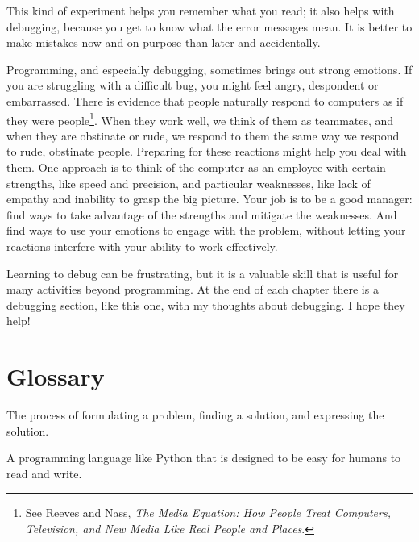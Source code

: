 
\begin{remark}
This kind of experiment helps you remember what you read; it also helps
with debugging, because you get to know what the error messages mean.
It is better to make mistakes now and on purpose than later
and accidentally.
\end{remark}

Programming, and especially debugging, sometimes brings out strong
emotions.  If you are struggling with a difficult bug, you might 
feel angry, despondent or embarrassed.
There is evidence that people naturally respond to computers as if
they were people\footnote{See Reeves and Nass, {\it The Media
		Equation: How People Treat Computers, Television, and New Media
		Like Real People and Places}.}.  
When they work well, we think
of them as teammates, and when they are obstinate or rude, we
respond to them the same way we respond to rude,
obstinate people.
Preparing for these reactions might help you deal with them.
One approach is to think of the computer as an employee with
certain strengths, like speed and precision, and
particular weaknesses, like lack of empathy and inability
to grasp the big picture.
Your job is to be a good manager: find ways to take advantage
of the strengths and mitigate the weaknesses.  And find ways
to use your emotions to engage with the problem,
without letting your reactions interfere with your ability
to work effectively.

Learning to debug can be frustrating, but it is a valuable skill
that is useful for many activities beyond programming.  At the
end of each chapter there is a debugging section, like this one,
with my thoughts about debugging.  I hope they help!


\section{Glossary}
	
\begin{vocabulary}  
The process of formulating a problem, finding a solution, and expressing the solution.
\end{vocabulary}
	
\begin{vocabulary}  A programming language like Python that
	is designed to be easy for humans to read and write.
\end{vocabulary}
	
